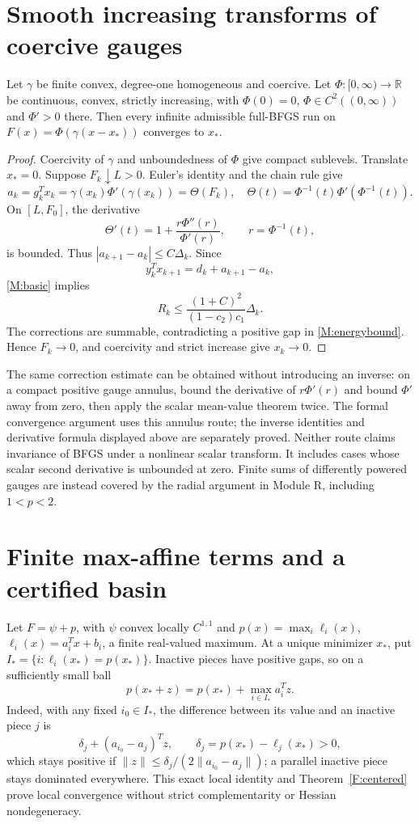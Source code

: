 \section{Smooth increasing transforms of coercive gauges}
\begin{theorem}\label{F:transform}
Let $\gamma$ be finite convex, degree-one homogeneous and coercive. Let $\Phi:[0,\infty)\to\mathbb R$ be continuous, convex, strictly increasing, with $\Phi(0)=0$, $\Phi\in C^2((0,\infty))$ and $\Phi'>0$ there. Then every infinite admissible full-BFGS run on $F(x)=\Phi(\gamma(x-x_*))$ converges to $x_*$.
\end{theorem}
\begin{proof}
Coercivity of $\gamma$ and unboundedness of $\Phi$ give compact sublevels. Translate $x_*=0$. Suppose $F_k\downarrow L>0$. Euler's identity and the chain rule give
\[
 a_k=g_k^Tx_k=\gamma(x_k)\Phi'(\gamma(x_k))=\Theta(F_k),
\quad\Theta(t)=\Phi^{-1}(t)\Phi'(\Phi^{-1}(t)).
\]
On $[L,F_0]$, the derivative
\[
 \Theta'(t)=1+\frac{r\Phi''(r)}{\Phi'(r)},\qquad r=\Phi^{-1}(t),
\]
is bounded. Thus $|a_{k+1}-a_k|\le C\Delta_k$. Since
\[
 y_k^Tx_{k+1}=d_k+a_{k+1}-a_k,
\]
\eqref{M:basic} implies
\[
 R_k\le\frac{(1+C)^2}{(1-c_2)c_1}\Delta_k.
\]
The corrections are summable, contradicting a positive gap in \eqref{M:energybound}. Hence $F_k\to0$, and coercivity and strict increase give $x_k\to0$.
\end{proof}
The same correction estimate can be obtained without introducing an inverse: on a compact positive gauge annulus, bound the derivative of $r\Phi'(r)$ and bound $\Phi'$ away from zero, then apply the scalar mean-value theorem twice. The formal convergence argument uses this annulus route; the inverse identities and derivative formula displayed above are separately proved. Neither route claims invariance of BFGS under a nonlinear scalar transform. It includes cases whose scalar second derivative is unbounded at zero. Finite sums of differently powered gauges are instead covered by the radial argument in Module R, including $1<p<2$.

\section{Finite max-affine terms and a certified basin}
Let $F=\psi+p$, with $\psi$ convex locally $C^{1,1}$ and $p(x)=\max_i\ell_i(x)$, $\ell_i(x)=a_i^Tx+b_i$, a finite real-valued maximum. At a unique minimizer $x_*$, put $I_*=\{i:\ell_i(x_*)=p(x_*)\}$. Inactive pieces have positive gaps, so on a sufficiently small ball
\begin{equation}\label{F:active}
 p(x_*+z)=p(x_*)+\max_{i\in I_*}a_i^Tz.
\end{equation}
Indeed, with any fixed $i_0\in I_*$, the difference between its value and an inactive piece $j$ is
\[
 \delta_j+(a_{i_0}-a_j)^Tz,\qquad \delta_j=p(x_*)-\ell_j(x_*)>0,
\]
which stays positive if $\|z\|\le\delta_j/(2\|a_{i_0}-a_j\|)$; a parallel inactive piece stays dominated everywhere. This exact local identity and Theorem~\ref{F:centered} prove local convergence without strict complementarity or Hessian nondegeneracy.

